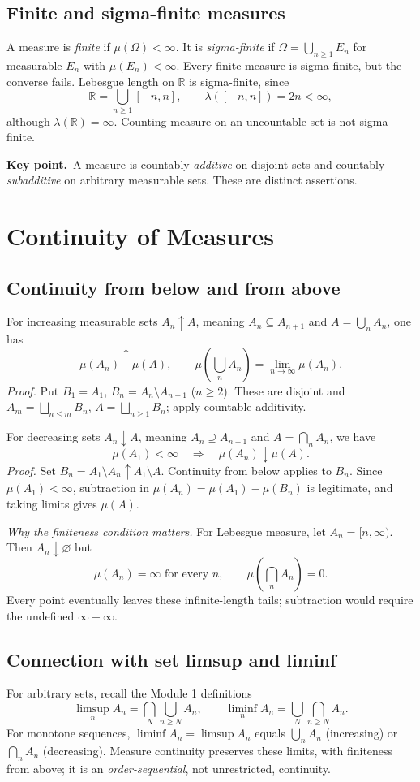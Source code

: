 \documentclass[10pt,a4paper]{article}
\newcommand{\R}{\mathbb R}
\newcommand{\key}[1]{\par\smallskip\textcolor{accent}{\textbf{Key point.}}\ #1\par}
\begin{document}
\subsection{Finite and sigma-finite measures}
A measure is \emph{finite} if $\mu(\Omega)<\infty$. It is
\emph{sigma-finite} if $\Omega=\bigcup_{n\ge1}E_n$ for measurable $E_n$
with $\mu(E_n)<\infty$. Every finite measure is sigma-finite, but the
converse fails. Lebesgue length on $\R$ is sigma-finite, since
\[
\R=\bigcup_{n\ge1}[-n,n],\qquad \lambda([-n,n])=2n<\infty,
\]
although $\lambda(\R)=\infty$. Counting measure on an uncountable set
is not sigma-finite.

\key{A measure is countably \emph{additive} on disjoint sets and countably
\emph{subadditive} on arbitrary measurable sets. These are distinct assertions.}

\section{Continuity of Measures}
\subsection{Continuity from below and from above}
For increasing measurable sets $A_n\uparrow A$, meaning
$A_n\subseteq A_{n+1}$ and $A=\bigcup_nA_n$, one has
\[
\boxed{\mu(A_n)\uparrow\mu(A),\qquad
\mu\!\left(\bigcup_nA_n\right)=\lim_{n\to\infty}\mu(A_n).}
\]
\emph{Proof.} Put $B_1=A_1$, $B_n=A_n\setminus A_{n-1}$ ($n\ge2$).
These are disjoint and $A_m=\bigsqcup_{n\le m}B_n$,
$A=\bigsqcup_{n\ge1}B_n$; apply countable additivity.

For decreasing sets $A_n\downarrow A$, meaning
$A_n\supseteq A_{n+1}$ and $A=\bigcap_nA_n$, we have
\[
\boxed{\mu(A_1)<\infty\quad\Longrightarrow\quad
\mu(A_n)\downarrow\mu(A).}
\]
\emph{Proof.} Set $B_n=A_1\setminus A_n\uparrow A_1\setminus A$.
Continuity from below applies to $B_n$. Since $\mu(A_1)<\infty$,
subtraction in $\mu(A_n)=\mu(A_1)-\mu(B_n)$ is legitimate, and taking
limits gives $\mu(A)$.

\emph{Why the finiteness condition matters.} For Lebesgue measure, let
$A_n=[n,\infty)$. Then $A_n\downarrow\varnothing$ but
\[
\boxed{\mu(A_n)=\infty\text{ for every }n,\qquad
\mu\!\left(\bigcap_nA_n\right)=0.}
\]
Every point eventually leaves these infinite-length tails; subtraction
would require the undefined $\infty-\infty$.

\subsection{Connection with set limsup and liminf}
For arbitrary sets, recall the Module 1 definitions
\[
\limsup_n A_n=\bigcap_N\bigcup_{n\ge N}A_n,
\qquad
\liminf_n A_n=\bigcup_N\bigcap_{n\ge N}A_n.
\]
For monotone sequences, $\liminf A_n=\limsup A_n$ equals
$\bigcup_nA_n$ (increasing) or $\bigcap_nA_n$ (decreasing).
Measure continuity preserves these limits, with finiteness from above;
it is an \emph{order-sequential}, not unrestricted, continuity.
\end{document}
